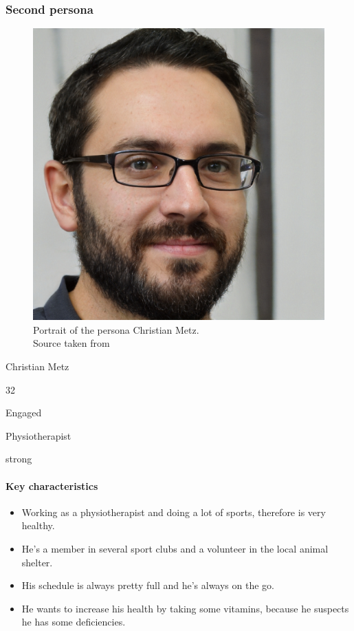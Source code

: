 \documentclass[conference]{IEEEtran}
\begin{document}
\subsubsection{Second persona} \hfill
\begin{figure}[htbp]
	\centerline{\includegraphics[width=.5\linewidth]{images/persona02.jpg}}
	\caption[Portrait of the persona Christian Metz; Source taken from \cite{b1}]
	{Portrait of the persona Christian Metz.\\ Source taken from \cite{b1}\endtabular}
	\label{fig:persona02}
\end{figure}

\begin{description}[labelwidth=\widthof{\bfseries Computer skills},leftmargin=.8cm,labelindent=.8cm]
	\item[Name] Christian Metz
	\item[Age] 32
	\item[Marital status] Engaged
	\item[Occupation] Physiotherapist
	\item[Computer skills] strong
\end{description}

\paragraph*{Key characteristics}
\begin{itemize}[leftmargin=1.25cm]
	\item Working as a physiotherapist and doing a lot of sports, therefore is very healthy.
	\item He's a member in several sport clubs and a volunteer in the local animal shelter.
	\item His schedule is always pretty full and he's always on the go.
	\item He wants to increase his health by taking some vitamins, because he suspects he has some deficiencies.
\end{itemize}
\end{document}
